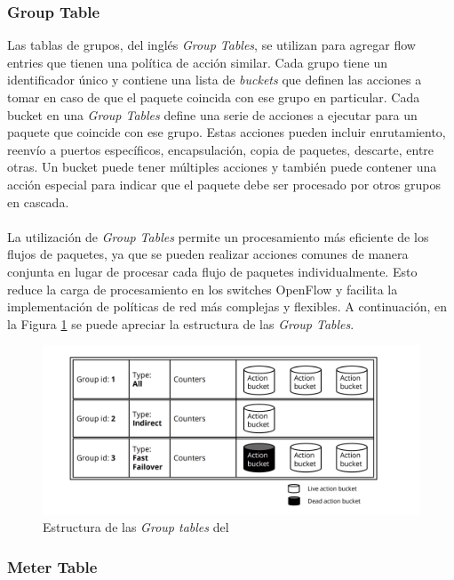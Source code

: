 \subsubsection{Group Table}

Las tablas de grupos, del inglés \textit{Group Tables}, se utilizan para agregar flow entries que tienen una política de acción similar. Cada grupo tiene un identificador único y contiene una lista de \textit{buckets} que definen las acciones a tomar en caso de que el paquete coincida con ese grupo en particular. Cada bucket en una \textit{Group Tables} define una serie de acciones a ejecutar para un paquete que coincide con ese grupo. Estas acciones pueden incluir enrutamiento, reenvío a puertos específicos, encapsulación, copia de paquetes, descarte, entre otras. Un bucket puede tener múltiples acciones y también puede contener una acción especial para indicar que el paquete debe ser procesado por otros grupos en cascada. \\
\\
La utilización de \textit{Group Tables} permite un procesamiento más eficiente de los flujos de paquetes, ya que se pueden realizar acciones comunes de manera conjunta en lugar de procesar cada flujo de paquetes individualmente. Esto reduce la carga de procesamiento en los switches OpenFlow y facilita la implementación de políticas de red más complejas y flexibles. A continuación, en la Figura \ref{fig:bofuss4} se puede apreciar la estructura de las \textit{Group Tables}.

\begin{figure}[ht]
    \centering
    \includegraphics[width=\textwidth]{archivos/img/teoria/bofuss4.png}
    \caption{Estructura de las \textit{Group tables} del  \cite{fernandes2015software}}
    \label{fig:bofuss4}
\end{figure}


\subsubsection{Meter Table}

